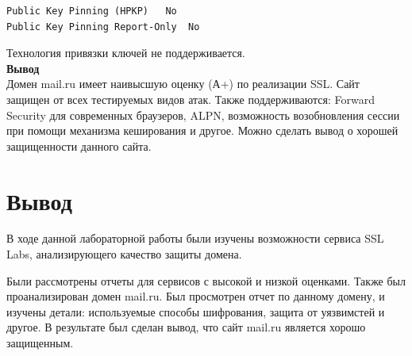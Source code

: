 \documentclass[10pt,a4paper,titlepage]{article}
\begin{document}
\begin{verbatim}
Public Key Pinning (HPKP)	No
Public Key Pinning Report-Only	No
\end{verbatim}
Технология привязки ключей не поддерживается.\\

\textbf{Вывод}\\
 Домен mail.ru имеет наивысшую оценку (А+) по реализации SSL. Сайт защищен от всех тестируемых видов атак. Также поддерживаются: Forward Security для современных браузеров, ALPN, возможность возобновления сессии при помощи механизма кеширования и другое. Можно сделать вывод о хорошей защищенности данного сайта.
 
\section{Вывод}
В ходе данной лабораторной работы были изучены возможности сервиса SSL Labs, анализирующего качество защиты домена.

Были рассмотрены отчеты для сервисов с высокой и низкой оценками. Также был проанализирован домен mail.ru. Был просмотрен отчет по данному домену,  и изучены детали: используемые способы шифрования, защита от уязвимстей и другое. В результате был сделан вывод, что сайт mail.ru является хорошо защищенным.
\end{document}
